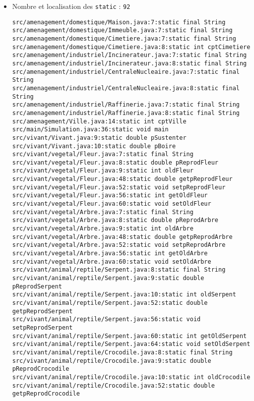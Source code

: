\documentclass[11pt,a4paper]{article}
\begin{document}
\begin{itemize}
\item{Nombre et localisation des \texttt{static} : \texttt{92}}
\begin{Verbatim}[xleftmargin=.3in, breaklines=true, breakanywhere=true]
src/amenagement/domestique/Maison.java:7:static final String
src/amenagement/domestique/Immeuble.java:7:static final String
src/amenagement/domestique/Cimetiere.java:7:static final String
src/amenagement/domestique/Cimetiere.java:8:static int cptCimetiere
src/amenagement/industriel/Incinerateur.java:7:static final String
src/amenagement/industriel/Incinerateur.java:8:static final String
src/amenagement/industriel/CentraleNucleaire.java:7:static final String
src/amenagement/industriel/CentraleNucleaire.java:8:static final String
src/amenagement/industriel/Raffinerie.java:7:static final String
src/amenagement/industriel/Raffinerie.java:8:static final String
src/amenagement/Ville.java:14:static int cptVille
src/main/Simulation.java:36:static void main
src/vivant/Vivant.java:9:static double pSustenter
src/vivant/Vivant.java:10:static double pBoire
src/vivant/vegetal/Fleur.java:7:static final String
src/vivant/vegetal/Fleur.java:8:static double pReprodFleur
src/vivant/vegetal/Fleur.java:9:static int oldFleur
src/vivant/vegetal/Fleur.java:48:static double getpReprodFleur
src/vivant/vegetal/Fleur.java:52:static void setpReprodFleur
src/vivant/vegetal/Fleur.java:56:static int getOldFleur
src/vivant/vegetal/Fleur.java:60:static void setOldFleur
src/vivant/vegetal/Arbre.java:7:static final String
src/vivant/vegetal/Arbre.java:8:static double pReprodArbre
src/vivant/vegetal/Arbre.java:9:static int oldArbre
src/vivant/vegetal/Arbre.java:48:static double getpReprodArbre
src/vivant/vegetal/Arbre.java:52:static void setpReprodArbre
src/vivant/vegetal/Arbre.java:56:static int getOldArbre
src/vivant/vegetal/Arbre.java:60:static void setOldArbre
src/vivant/animal/reptile/Serpent.java:8:static final String
src/vivant/animal/reptile/Serpent.java:9:static double pReprodSerpent
src/vivant/animal/reptile/Serpent.java:10:static int oldSerpent
src/vivant/animal/reptile/Serpent.java:52:static double getpReprodSerpent
src/vivant/animal/reptile/Serpent.java:56:static void setpReprodSerpent
src/vivant/animal/reptile/Serpent.java:60:static int getOldSerpent
src/vivant/animal/reptile/Serpent.java:64:static void setOldSerpent
src/vivant/animal/reptile/Crocodile.java:8:static final String
src/vivant/animal/reptile/Crocodile.java:9:static double pReprodCrocodile
src/vivant/animal/reptile/Crocodile.java:10:static int oldCrocodile
src/vivant/animal/reptile/Crocodile.java:52:static double getpReprodCrocodile

\end{Verbatim}
\end{itemize}
\end{document}
